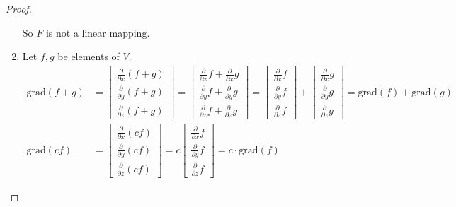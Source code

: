 \begin{proof}
\begin{enumerate}[label={(\alph*)}]
              So $F$ is not a linear mapping.
        \item Let $f, g$ be elements of $V$.
              \begin{align*}
                  \text{grad}(f + g) & = \begin{bmatrix}
                                             \frac{\partial}{\partial x}(f + g) \\
                                             \frac{\partial}{\partial y}(f + g) \\
                                             \frac{\partial}{\partial z}(f + g)
                                         \end{bmatrix}
                  = \begin{bmatrix}
                        \frac{\partial}{\partial x}f + \frac{\partial}{\partial x}g \\
                        \frac{\partial}{\partial y}f + \frac{\partial}{\partial y}g \\
                        \frac{\partial}{\partial z}f + \frac{\partial}{\partial z}g
                    \end{bmatrix}
                  = \begin{bmatrix}
                        \frac{\partial}{\partial x}f \\
                        \frac{\partial}{\partial y}f \\
                        \frac{\partial}{\partial z}f
                    \end{bmatrix} +
                  \begin{bmatrix}
                      \frac{\partial}{\partial x}g \\
                      \frac{\partial}{\partial y}g \\
                      \frac{\partial}{\partial z}g
                  \end{bmatrix}
                  = \text{grad}(f) + \text{grad}(g)                         \\
                  \text{grad}(cf)    & = \begin{bmatrix}
                                             \frac{\partial}{\partial x}(cf) \\
                                             \frac{\partial}{\partial y}(cf) \\
                                             \frac{\partial}{\partial z}(cf)
                                         \end{bmatrix}
                  = c\begin{bmatrix}
                         \frac{\partial}{\partial x}f \\
                         \frac{\partial}{\partial y}f \\
                         \frac{\partial}{\partial z}f
                     \end{bmatrix}
                  = c\cdot\text{grad}(f)
              \end{align*}


\end{enumerate}
\end{proof}
